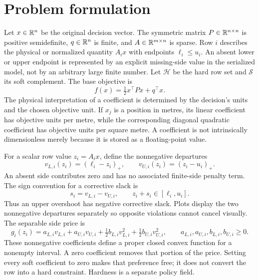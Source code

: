 \section{Problem formulation}\label{sec:formulation}
Let $x\in\mathbb{R}^n$ be the original decision vector. The symmetric matrix
$P\in\mathbb{R}^{n\times n}$ is positive semidefinite, $q\in\mathbb{R}^n$ is finite, and
$A\in\mathbb{R}^{m\times n}$ is sparse. Row $i$ describes the physical or normalized
quantity $A_i x$ with endpoints $\ell_i\leq u_i$. An absent lower or upper
endpoint is represented by an explicit missing-side value in the serialized
model, not by an arbitrary large finite number. Let $\mathcal H$ be the hard
row set and $\mathcal S$ its soft complement. The base objective is
\begin{equation}\label{eq:base-objective}
 f(x)=\tfrac12x^\top P x+q^\top x.
\end{equation}
The physical interpretation of a coefficient is determined by the decision's
units and the chosen objective unit. If $x_j$ is a position in metres, its linear
coefficient has objective units per metre, while the corresponding diagonal
quadratic coefficient has objective units per square metre. A coefficient is not
intrinsically dimensionless merely because it is stored as a floating-point value.

For a scalar row value $z_i=A_i x$, define the nonnegative departures
\begin{equation}\label{eq:departures}
 v_{L,i}(z_i)=(\ell_i-z_i)_+,\qquad
 v_{U,i}(z_i)=(z_i-u_i)_+.
\end{equation}
An absent side contributes zero and has no associated finite-side penalty term.
The sign convention for a corrective slack is
\begin{equation}\label{eq:corrective-slack}
 s_i=v_{L,i}-v_{U,i},\qquad z_i+s_i\in[\ell_i,u_i].
\end{equation}
Thus an upper overshoot has negative corrective slack. Plots display the two
nonnegative departures separately so opposite violations cannot cancel visually.
The separable side price is
\begin{equation}\label{eq:side-price}
 g_i(z_i)=a_{L,i}v_{L,i}+a_{U,i}v_{U,i}
       +\tfrac12b_{L,i}v_{L,i}^2+\tfrac12b_{U,i}v_{U,i}^2,
 \qquad a_{L,i},a_{U,i},b_{L,i},b_{U,i}\geq0.
\end{equation}
These nonnegative coefficients define a proper closed convex function for a
nonempty interval. A zero coefficient removes that portion of the price. Setting
every soft coefficient to zero makes that preference free; it does not convert
the row into a hard constraint. Hardness is a separate policy field.

